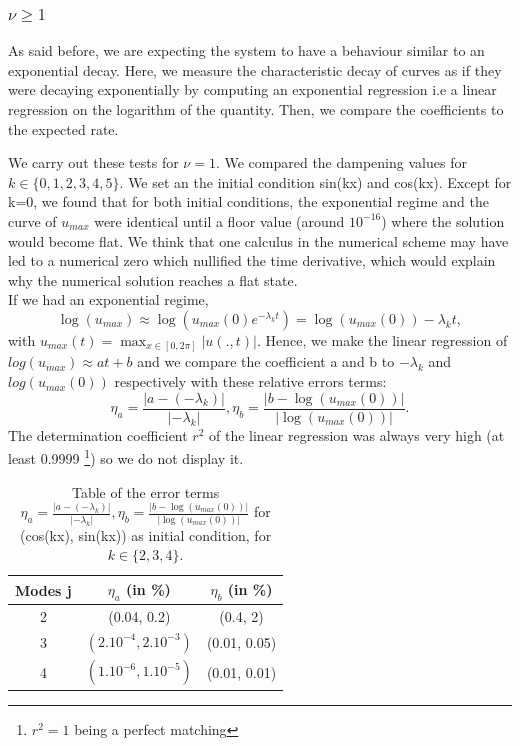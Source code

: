 \documentclass[12pt]{article}
\begin{document}
\subsubsection{\texorpdfstring{$\nu \geq 1$}{nu >= 1}}

As said before, we are expecting the system to have a behaviour similar to an exponential decay. Here, we measure the characteristic 
decay of curves as if they were decaying exponentially by computing an exponential regression i.e a linear regression on the logarithm of the quantity. Then,
 we compare the coefficients to the expected rate. 

We carry out these tests for $\nu =1$. We compared the dampening values for $k \in \{0, 1, 2, 3, 4, 5\}.$ We set an the initial condition 
sin(kx) and cos(kx). Except for k=0, we found that for both initial conditions, the exponential regime and the curve of $u_{max}$ were identical 
until a floor value (around $10^{-16}$) where the solution would become flat. We think that one calculus in the numerical scheme may have led to a numerical zero which nullified the time derivative, which would explain why the numerical solution reaches a flat state. 
\\

If we had an exponential regime,   $$\log(u_{max}) \approx \log(u_{max}(0)e^{-\lambda_k t}) = \log(u_{max}(0)) -  \lambda_k t,$$
 with $u_{max}(t) = \max_{x\in[0,2\pi]}|u(.,t)|.$ Hence, we make the linear regression of $log(u_{max})\approx at + b$ and we compare the coefficient a and b to $-\lambda_k$  and $log(u_{max}(0))$ respectively with these relative errors terms: 
 $$\eta_a = \frac{|a-(-\lambda_k)|}{|-\lambda_k|}, \eta_b = \frac{|b-\log(u_{max}(0))|}{|\log(u_{max}(0))|}.$$  The determination coefficient $r^2$ of
 the linear regression was always very high (at least 0.9999 \footnote{$r^2 = 1$ being a perfect matching}) so we do not display it. 

\begin{table}
\centering
\begin{tabular}{ |c|c|c| } 
 \hline
    Modes j  & $\eta_a$ (in \%) & $\eta_b$ (in \%)  \\
 \hline
 2 & (0.04, 0.2) & (0.4, 2) \\ 
 3 & $(2.10^{-4}, 2.10^{-3})$ & (0.01, 0.05) \\ 
 4 & $(1.10^{-6}, 1.10^{-5})$ & (0.01, 0.01) \\ 
 \hline
\end{tabular}
\caption{Table of the error terms $\eta_a = \frac{|a-(-\lambda_k)|}{|-\lambda_k|}, \eta_b = \frac{|b-\log(u_{max}(0))|}{|\log(u_{max}(0))|}$ for 
(cos(kx), sin(kx)) as initial condition, for $k \in \{2, 3, 4\}$.}
\end{table}
\end{document}
